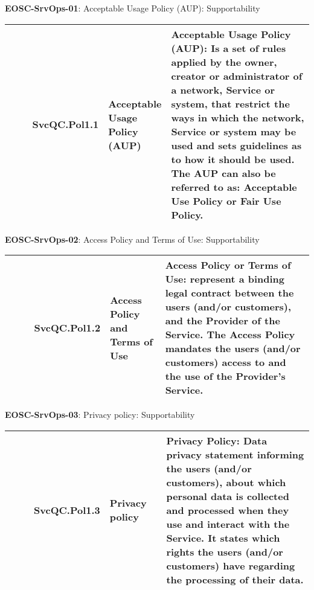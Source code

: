 \textbf{EOSC-SrvOps-01}: Acceptable Usage Policy (AUP): Supportability
\nopagebreak[4]
\begin{center}
    \tabletail{\hline}
    \tiny
    \begin{supertabular}{|p{0.10\linewidth}|p{0.10\linewidth}|p{0.20\linewidth}|p{0.60\linewidth}|} \hline
        \cite{orviz_fernandez_eosc-synergy_2020} & SvcQC.Pol1.1 & Acceptable Usage Policy (AUP) & Acceptable Usage Policy (AUP): Is a set of rules applied by the owner, creator or administrator of a network, Service or system, that restrict the ways in which the network, Service or system may be used and sets guidelines as to how it should be used. The AUP can also be referred to as: Acceptable Use Policy or Fair Use Policy.\\ \hline
    \end{supertabular}
\end{center}

\textbf{EOSC-SrvOps-02}: Access Policy and Terms of Use: Supportability
\nopagebreak[4]
\begin{center}
    \tabletail{\hline}
    \tiny
    \begin{supertabular}{|p{0.10\linewidth}|p{0.10\linewidth}|p{0.20\linewidth}|p{0.60\linewidth}|} \hline
        \cite{orviz_fernandez_eosc-synergy_2020} & SvcQC.Pol1.2 & Access Policy and Terms of Use & Access Policy or Terms of Use: represent a binding legal contract between the users (and/or customers), and the Provider of the Service. The Access Policy mandates the users (and/or customers) access to and the use of the Provider's Service.\\ \hline
    \end{supertabular}
\end{center}

\textbf{EOSC-SrvOps-03}: Privacy policy: Supportability
\nopagebreak[4]
\begin{center}
    \tabletail{\hline}
    \tiny
    \begin{supertabular}{|p{0.10\linewidth}|p{0.10\linewidth}|p{0.20\linewidth}|p{0.60\linewidth}|} \hline
        \cite{orviz_fernandez_eosc-synergy_2020} & SvcQC.Pol1.3 & Privacy policy & Privacy Policy: Data privacy statement informing the users (and/or customers), about which personal data is collected and processed when they use and interact with the Service. It states which rights the users (and/or customers) have regarding the processing of their data.\\ \hline
    \end{supertabular}
\end{center}

